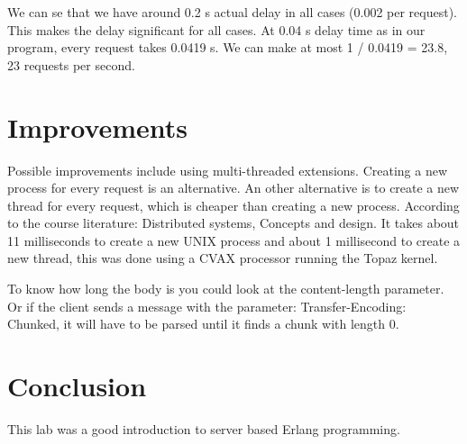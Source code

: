\documentclass[a4paper]{article}
\begin{document}
We can se that we have around 0.2 s actual delay in all cases (0.002 per request). This makes the delay significant for all cases. At 0.04 s delay time as in our program, every request takes 0.0419 s. We can make at most 1 / 0.0419 = 23.8, 23 requests per second.

\section{Improvements}
Possible improvements  include using multi-threaded extensions. Creating a new process for every request is an alternative. An other alternative is to create a new thread for every request, which is cheaper than creating a new process. According to the course literature: Distributed systems, Concepts and design. It takes about 11 milliseconds to create a new UNIX process and about 1 millisecond to create a new thread, this was done using a CVAX processor running the Topaz kernel.

To know how long the body is you could look at the content-length parameter. Or if the client sends a message with the parameter: Transfer-Encoding: Chunked, it will have to be parsed until it finds a chunk with length 0.

\section{Conclusion}
This lab was a good introduction to server based Erlang programming.
\end{document}
